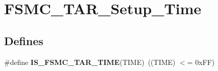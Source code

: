 \hypertarget{group__FSMC__TAR__Setup__Time}{
\section{FSMC\_\-TAR\_\-Setup\_\-Time}
\label{group__FSMC__TAR__Setup__Time}
}
\subsection*{Defines}
\begin{DoxyCompactItemize}
\item 
\hypertarget{group__FSMC__TAR__Setup__Time_ga5b9e0f64c44ab68afca90cd28dedd8e3}{
\#define {\bfseries IS\_\-FSMC\_\-TAR\_\-TIME}(TIME)~((TIME) $<$= 0xFF)}
\label{group__FSMC__TAR__Setup__Time_ga5b9e0f64c44ab68afca90cd28dedd8e3}

\end{DoxyCompactItemize}
